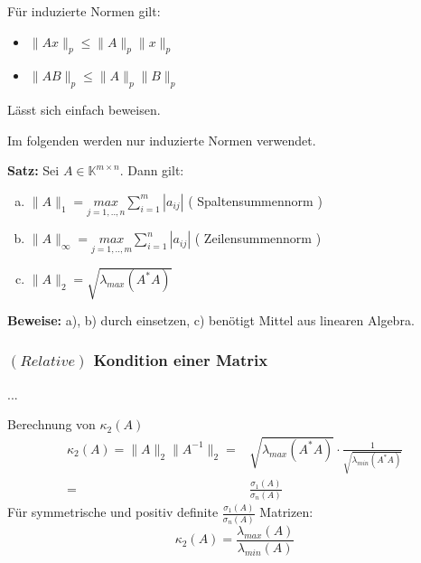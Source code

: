 Für induzierte Normen gilt:

\begin{itemize}
\item{$\|Ax\|_p \leq \|A\|_p \|x\|_p$}
\item{$\|A B\|_p \leq \|A\|_p \|B\|_p$}
\end{itemize}
Lässt sich einfach beweisen.

Im folgenden werden nur induzierte Normen verwendet.

\textbf{Satz:}
Sei $A \in \mathbb{K}^{m \times n}$. Dann gilt:
\begin{enumerate}[a)]
  \item{$\|A\|_1 = \underset{j = 1,..,n}{max} \sum\limits_{i=1}^{m}{\left|a_{ij}\right|}$ ( Spaltensummennorm )}
  \item{$\|A\|_{\infty} = \underset{j = 1,..,m}{max} \sum\limits_{i=1}^{n}{\left|a_{ij}\right|}$ ( Zeilensummennorm )}
  \item{$\|A\|_2 = \sqrt{\lambda_{max}\left(A^*A\right)}$}
\end{enumerate}
\textbf{Beweise:} a), b) durch einsetzen, c) benötigt Mittel aus linearen Algebra.

\subsubsection{$\left(Relative\right)$ Kondition einer Matrix}
...

Berechnung von $\kappa_2\left(A\right)$
\begin{equation*}
  \begin{aligned}
    \kappa_2(A) = \|A\|_2 \|A^{-1}\|_2 = &\sqrt{\lambda_{max}\left(A^*A\right)} \cdot \frac{1}{\sqrt{\lambda_{min}\left(A^*A\right)}} \\
    = &\frac{\sigma_1\left(A\right)}{\sigma_n\left(A\right)}
  \end{aligned}
\end{equation*}
Für symmetrische und positiv definite $\frac{\sigma_1\left(A\right)}{\sigma_n\left(A\right)}$ Matrizen:
\begin{equation*}
  \kappa_2(A) = \frac{\lambda_{max}\left(A\right)}{\lambda_{min}\left(A\right)}
\end{equation*}

